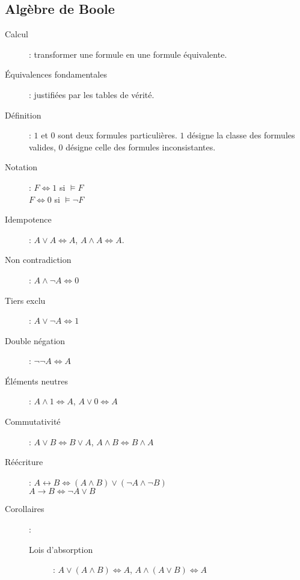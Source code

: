 \documentclass[10pt,a4paper]{article}
\begin{document}
	\subsection{Algèbre de Boole}
		\begin{description}
			\item[Calcul]: transformer une formule en une formule équivalente.
			\item[Équivalences fondamentales]: justifiées par les tables de vérité.
			\item[Définition]: $1$ et $0$ sont deux formules particulières. $1$ désigne la classe des formules valides, $0$ désigne celle des formules inconsistantes.
			\item[Notation]: $F\Leftrightarrow 1$ si $\vDash F$\\$F\Leftrightarrow 0$ si $\vDash\neg F$
			\item[Idempotence]: $A\vee A\Leftrightarrow A$, $A\wedge A\Leftrightarrow A$.
			\item[Non contradiction]: $A\wedge\neg A\Leftrightarrow 0$
			\item[Tiers exclu]: $A\vee\neg A\Leftrightarrow 1$
			\item[Double négation]: $\neg\neg A \Leftrightarrow A$
			\item[Éléments neutres]: $A\wedge 1 \Leftrightarrow A$, $A\vee 0 \Leftrightarrow A$
			\item[Commutativité]: $A\vee B\Leftrightarrow B\vee A$, $A\wedge B\Leftrightarrow B\wedge A$
			\item[Réécriture]: $A\leftrightarrow B \Leftrightarrow (A\wedge B)\vee (\neg A\wedge\neg B)$\\$A\rightarrow B \Leftrightarrow \neg A\vee B$
			\item[Corollaires]:
				\begin{description}
					\item[Lois d'absorption]: $A\vee (A\wedge B) \Leftrightarrow A$, $A\wedge (A\vee B) \Leftrightarrow A$
				\end{description}
		\end{description}
\end{document}
